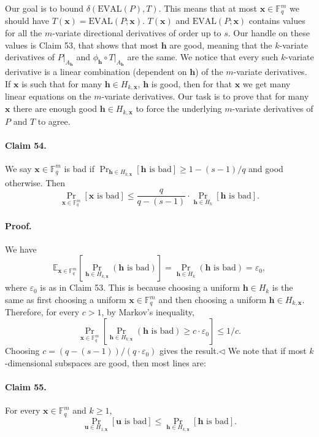 \documentclass[10pt,a4paper]{article}
\begin{document}
Our goal is to bound $\delta(\mathrm{EVAL}(P),T)$. This means that at most $\boldsymbol x\in\mathbb F_q^m$ we should have $T(\boldsymbol x)=\mathrm{EVAL}(P;\boldsymbol x)$. $T(\boldsymbol x)$ and $\mathrm{EVAL}(P;\boldsymbol x)$ contains values for all the $m$-variate directional derivatives of order up to $s$. Our handle on these values is Claim 53, that shows that most $\boldsymbol h$ are good, meaning that the $k$-variate derivatives of $P|_{A_{\boldsymbol h}}$ and $\phi_{\boldsymbol h}\circ T|_{A_{\boldsymbol h}}$ are the same. We notice that every such $k$-variate derivative is a linear combination (dependent on $\boldsymbol h$) of the $m$-variate derivatives. If $\boldsymbol x$ is such that for many $\boldsymbol h\in H_{k,\boldsymbol x}$, $\boldsymbol h$ is good, then for that $\boldsymbol x$ we get many linear equations on the $m$-variate derivatives. Our task is to prove that for many $\boldsymbol x$ there are enough good $\boldsymbol h\in H_{k,\boldsymbol x}$ to force the underlying $m$-variate derivatives of $P$ and $T$ to agree.
\paragraph{Claim 54.} We say $\boldsymbol x\in\mathbb F_q^m$ is bad if $\Pr_{\boldsymbol h\in H_{k,\boldsymbol x}}[\boldsymbol h\text{ is bad}]\geq1-(s-1)/q$ and good otherwise. Then
\[\Pr_{\boldsymbol x\in\mathbb F_q^m}[\boldsymbol x\text{ is bad}]\leq\frac q{q-(s-1)}\cdot\Pr_{\boldsymbol h\in H_k}[\boldsymbol h\text{ is bad}].\]
\paragraph{Proof.} We have
\[\mathbb E_{\boldsymbol x\in\mathbb F_q^m}\left[\Pr_{\boldsymbol h\in H_{k,\boldsymbol x}}(\boldsymbol h\text{ is bad})\right]=\Pr_{\boldsymbol h\in H_k}(\boldsymbol h\text{ is bad})=\varepsilon_0,\]
where $\varepsilon_0$ is as in Claim 53. This is because choosing a uniform $\boldsymbol h\in H_k$ is the same as first choosing a uniform $\boldsymbol x\in\mathbb F_q^m$ and then choosing a uniform $\boldsymbol h\in H_{k,\boldsymbol x}$. Therefore, for every $c>1$, by Markov's inequality,
\[\Pr_{\boldsymbol x\in\mathbb F_q^m}\left[\Pr_{\boldsymbol h\in H_{k,\boldsymbol x}}(\boldsymbol h\text{ is bad})\geq c\cdot\varepsilon_0\right]\leq1/c.\]
Choosing $c=(q-(s-1))/(q\cdot\varepsilon_0)$ gives the result.\hfill$\triangleleft$
We note that if most $k$-dimensional subspaces are good, then most lines are:
\paragraph{Claim 55.} For every $\boldsymbol x\in\mathbb F_q^m$ and $k\geq1$,
\[\Pr_{\boldsymbol u\in H_{1,\boldsymbol x}}[\boldsymbol u\text{ is bad}]\leq\Pr_{\boldsymbol h\in H_{k,\boldsymbol x}}[\boldsymbol h\text{ is bad}].\]
\end{document}
